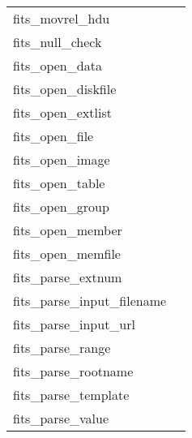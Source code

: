 \documentclass[11pt]{book}
\begin{document}
\begin{tabular}{lr}
fits\_movrel\_hdu     & \pageref{ffmrhd} \\
fits\_null\_check     & \pageref{ffnchk} \\
fits\_open\_data      & \pageref{ffopen} \\
fits\_open\_diskfile    & \pageref{ffopen} \\
fits\_open\_extlist      & \pageref{ffopen} \\
fits\_open\_file      & \pageref{ffopen} \\
fits\_open\_image      & \pageref{ffopen} \\
fits\_open\_table      & \pageref{ffopen} \\
fits\_open\_group    & \pageref{ffgtop} \\
fits\_open\_member    & \pageref{ffgmop} \\
fits\_open\_memfile   & \pageref{ffomem} \\
fits\_parse\_extnum   & \pageref{ffextn} \\
fits\_parse\_input\_filename & \pageref{ffiurl} \\
fits\_parse\_input\_url & \pageref{ffiurl} \\
fits\_parse\_range    & \pageref{ffrwrg} \\
fits\_parse\_rootname & \pageref{ffrtnm} \\
fits\_parse\_template & \pageref{ffgthd} \\
fits\_parse\_value    & \pageref{ffpsvc} \\
\end{tabular}
\end{document}
